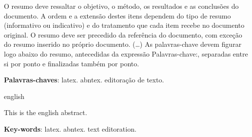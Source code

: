 \documentclass[
	12pt,				%
	openright,			%
	twoside,			%
	a4paper,			%
	english,			%
	brazil				%
	]{abntex2}
\begin{document}

\setlength{\absparsep}{18pt} %
\begin{resumo}
 \noindent O resumo deve ressaltar o objetivo, o método, os resultados e as conclusões do documento. A ordem e a extensão
 destes itens dependem do tipo de resumo (informativo ou indicativo) e do tratamento que cada item recebe no documento original. O resumo deve ser precedido da referência do documento, com exceção do resumo inserido no
 próprio documento. (\ldots) As palavras-chave devem figurar logo abaixo do resumo, antecedidas da expressão Palavras-chave:, separadas entre si por
 ponto e finalizadas também por ponto.

 \textbf{Palavras-chaves}: latex. abntex. editoração de texto.
\end{resumo}

\begin{resumo}[Abstract]
 \begin{otherlanguage*}{english}

\noindent This is the english abstract.

   \vspace{\onelineskip}

   \noindent
   \textbf{Key-words}: latex. abntex. text editoration.
 \end{otherlanguage*}
\end{resumo}

%
%
%
\listoffigures*
\cleardoublepage

\listoftables*
\cleardoublepage
\end{document}

